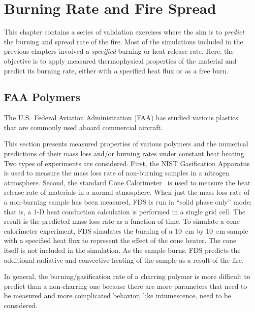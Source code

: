 
\chapter{Burning Rate and Fire Spread}

This chapter contains a series of validation exercises where the aim is to {\em predict} the burning and spread rate of the fire. Most of the simulations included in the previous chapters involved a {\em specified} burning or heat release rate. Here, the objective is to apply measured thermophysical properties of the material and predict its burning rate, either with a specified heat flux or as a free burn.



\section{FAA Polymers}\label{sec_FAA_Polymers}

The U.S.~Federal Aviation Administration (FAA) has studied various plastics that are commonly used aboard commercial aircraft.

This section presents measured properties of various polymers and the numerical predictions of their mass loss and/or burning rates under constant heat heating. Two types of experiments are considered. First, the NIST Gasification Apparatus is used to measure the mass loss rate of non-burning samples in a nitrogen atmosphere. Second, the standard Cone Calorimeter~\cite{conecal} is used to measure the heat release rate of materials in a normal atmosphere. When just the mass loss rate of a non-burning sample has been measured, FDS is run in ``solid phase only'' mode; that is, a 1-D heat conduction calculation is performed in a single grid cell. The result is the predicted mass loss rate as a function of time. To simulate a cone calorimeter experiment, FDS simulates the burning of a 10~cm by 10~cm sample with a specified heat flux to represent the effect of the cone heater. The cone itself is not included in the simulation. As the sample burns, FDS predicts the additional radiative and convective heating of the sample as a result of the fire.

In general, the burning/gasification rate of a charring polymer is more difficult to predict than a non-charring one because there are more parameters that need to be measured and
more complicated behavior, like intumescence, need to be considered.

